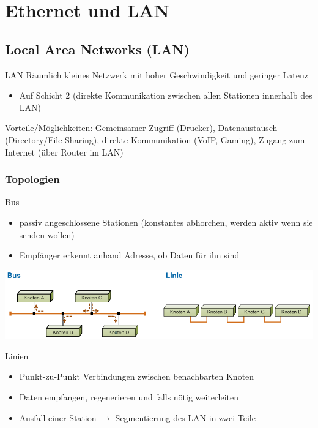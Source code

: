 \section{Ethernet und LAN}
\subsection{Local Area Networks (LAN)}

\begin{definition}{LAN}
    Räumlich kleines Netzwerk mit hoher Geschwindigkeit und geringer Latenz
    \begin{itemize}
        \item Auf Schicht 2 (direkte Kommunikation zwischen allen Stationen innerhalb des LAN)
    \end{itemize}
    Vorteile/Möglichkeiten: Gemeinsamer Zugriff (Drucker), Datenaustausch (Directory/File Sharing), direkte Kommunikation (VoIP, Gaming), Zugang zum Internet (über Router im LAN)
\end{definition}

\subsubsection{Topologien}

\begin{definition}{Bus}
    \begin{itemize}
        \item passiv angeschlossene Stationen (konstantes abhorchen, werden aktiv wenn sie senden wollen)
        \item Empfänger erkennt anhand Adresse, ob Daten für ihn sind
    \end{itemize}
\end{definition}

 
    \centering
    \includegraphics[width=0.9\linewidth]{images/bus_linie_topo.png}
 

\begin{definition}{Linien}
    \begin{itemize}
        \item Punkt-zu-Punkt Verbindungen zwischen benachbarten Knoten
        \item Daten empfangen, regenerieren und falls nötig weiterleiten
        \item Ausfall einer Station $\rightarrow$ Segmentierung des LAN in zwei Teile
    \end{itemize}
\end{definition}

